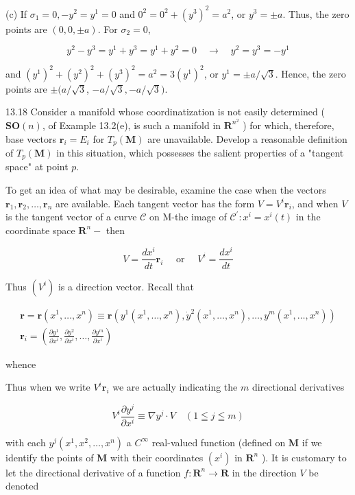 \documentclass[10pt]{article}
\begin{document}
(c) If $\sigma_{1}=0,-y^{2}=y^{1}=0$ and $0^{2}=0^{2}+\left(y^{3}\right)^{2}=a^{2}$, or $y^{3}= \pm a$. Thus, the zero points are $(0,0, \pm a)$. For $\sigma_{2}=0$,

$$
y^{2}-y^{3}=y^{1}+y^{3}=y^{1}+y^{2}=0 \quad \rightarrow \quad y^{2}=y^{3}=-y^{1}
$$

and $\left(y^{1}\right)^{2}+\left(y^{2}\right)^{2}+\left(y^{3}\right)^{2}=a^{2}=3\left(y^{1}\right)^{2}$, or $y^{1}= \pm a / \sqrt{3}$. Hence, the zero points are $\pm(a / \sqrt{3}$, $-a / \sqrt{3},-a / \sqrt{3})$.

13.18 Consider a manifold whose coordinatization is not easily determined ( $\mathbf{S O}(n)$, of Example 13.2(e), is such a manifold in $\mathbf{R}^{n^{2}}$ ) for which, therefore, base vectors $\mathbf{r}_{i}=E_{i}$ for $T_{p}(\mathbf{M})$ are unavailable. Develop a reasonable definition of $T_{p}(\mathbf{M})$ in this situation, which possesses the salient properties of a "tangent space" at point $p$.

To get an idea of what may be desirable, examine the case when the vectors $\mathbf{r}_{1}, \mathbf{r}_{2}, \ldots, \mathbf{r}_{n}$ are available. Each tangent vector has the form $V=V^{i} \mathbf{r}_{i}$, and when $V$ is the tangent vector of a curve $\mathscr{C}$ on M-the image of $\mathscr{C}^{\prime}: x^{i}=x^{i}(t)$ in the coordinate space $\mathbf{R}^{n}-$ then

$$
V=\frac{d x^{i}}{d t} \mathbf{r}_{i} \quad \text { or } \quad V^{i}=\frac{d x^{i}}{d t}
$$

Thus $\left(V^{i}\right)$ is a direction vector. Recall that

$$
\begin{gathered}
\mathbf{r}=\mathbf{r}\left(x^{1}, \ldots, x^{n}\right) \equiv \mathbf{r}\left(y^{1}\left(x^{1}, \ldots, x^{n}\right), \dot{y}^{2}\left(x^{1}, \ldots, x^{n}\right), \ldots, y^{m}\left(x^{1}, \ldots, x^{n}\right)\right) \\
\mathbf{r}_{i}=\left(\frac{\partial y^{1}}{\partial x^{i}}, \frac{\partial y^{2}}{\partial x^{i}}, \ldots, \frac{\partial y^{m}}{\partial x^{i}}\right)
\end{gathered}
$$

whence

Thus when we write $V^{i} \mathbf{r}_{i}$ we are actually indicating the $m$ directional derivatives

$$
V^{i} \frac{\partial y^{j}}{\partial x^{i}} \equiv \nabla y^{j} \cdot V \quad(1 \leqq j \leqq m)
$$

with each $y^{j}\left(x^{1}, x^{2}, \ldots, x^{n}\right)$ a $C^{\infty}$ real-valued function (defined on $\mathbf{M}$ if we identify the points of $\mathbf{M}$ with their coordinates $\left(x^{i}\right)$ in $\mathbf{R}^{n}$ ). It is customary to let the directional derivative of a function $f: \mathbf{R}^{n} \rightarrow \mathbf{R}$ in the direction $V$ be denoted
\end{document}
